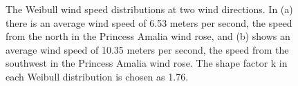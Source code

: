\begin{figure}[htbp]
  \centering
  \caption{\label{weibull} The Weibull wind speed distributions at two wind directions. In (a) there is an average wind speed of 6.53 meters per second, the speed from the north in the Princess Amalia wind rose, and (b) shows an average wind speed of 10.35 meters per second, the speed from the southwest in the Princess Amalia wind rose. The shape factor k in each Weibull distribution is chosen as 1.76.}
\end{figure}
